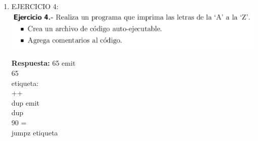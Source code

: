 \documentclass[conference]{IEEEtran}
\begin{document}
\begin{enumerate}
\begin{center}
	\end{center}
	
\item  EJERCICIO 4:\\
	\includegraphics{e4} \\
	\begin{center}
	\textbf{Respuesta: } 65 emit \\ 65 \\ etiqueta: \\ ++ \\ dup emit \\ dup \\ 90 = \\ jumpz etiqueta \\ 
	\end{center}


\end{enumerate}
\end{document}
